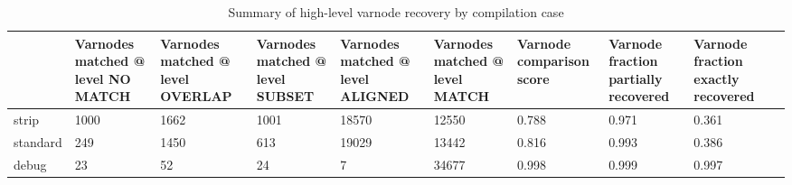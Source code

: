 \begin{table}
\centering
\caption{Summary of high-level varnode recovery by compilation case}
\label{table:opts-varnodes-summary}
\begin{tabular}{lp{1.22cm}p{1.22cm}p{1.22cm}p{1.22cm}p{1.22cm}p{1.22cm}p{1.22cm}p{1.22cm}p{1.22cm}}
\toprule
{} &  Varnodes matched @ level NO MATCH &  Varnodes matched @ level OVERLAP &  Varnodes matched @ level SUBSET &  Varnodes matched @ level ALIGNED &  Varnodes matched @ level MATCH &  Varnode comparison score &  Varnode fraction partially recovered &  Varnode fraction exactly recovered \\
\midrule
strip    &                               1000 &                              1662 &                             1001 &                             18570 &                           12550 &                     0.788 &                                 0.971 &                               0.361 \\
standard &                                249 &                              1450 &                              613 &                             19029 &                           13442 &                     0.816 &                                 0.993 &                               0.386 \\
debug    &                                 23 &                                52 &                               24 &                                 7 &                           34677 &                     0.998 &                                 0.999 &                               0.997 \\
\bottomrule
\end{tabular}
\end{table}
